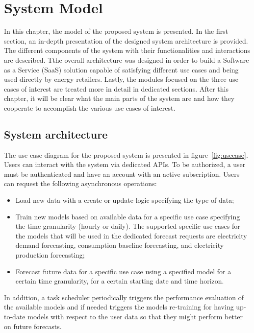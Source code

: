 \chapter{System Model}
\label{cha:system}
\vspace{0.4 cm}

In this chapter, the model of the proposed system is presented.
In the first section, an in-depth presentation of the designed system architecture is provided.
The different components of the system with their functionalities and interactions are described.
Tthe overall architecture was designed in order to build a Software as a Service (SaaS) solution capable of satisfying different use cases and being used directly by energy retailers.
Lastly, the modules focused on the three use cases of interest are treated more in detail in dedicated sections.
After this chapter, it will be clear what the main parts of the system are and how they cooperate to accomplish the various use cases of interest.


\section{System architecture}
\label{sec:architecture}
\vspace{0.2 cm}

The use case diagram for the proposed system is presented in figure~\ref{fig:usecase}.
Users can interact with the system via dedicated APIs.
To be authorized, a user must be authenticated and have an account with an active subscription.
Users can request the following asynchronous operations:
\begin{itemize}
  \item Load new data with a create or update logic specifying the type of data;
  \item Train new models based on available data for a specific use case specifying the time granularity (hourly or daily). The supported specific use cases for the models that will be used in the dedicated forecast requests are electricity demand forecasting, consumption baseline forecasting, and electricity production forecasting;
  \item Forecast future data for a specific use case using a specified model for a certain time granularity, for a certain starting date and time horizon.
\end{itemize}

In addition, a task scheduler periodically triggers the performance evaluation of the available models and if needed triggers the models re-training for having up-to-date models with respect to the user data so that they might perform better on future forecasts.


